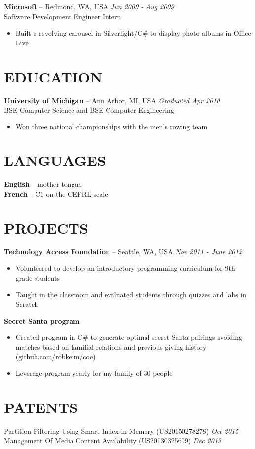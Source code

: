 \documentclass[]{rob-keim-resume}
\begin{document}
{\bf Microsoft} --  Redmond, WA, USA \hfill {\sl Jun 2009 - Aug 2009} \\
Software Development Engineer Intern
\begin{itemize} \itemsep -2pt
\item Built a revolving carousel in Silverlight/C\# to display photo albums in Office Live
\end{itemize}

\section{EDUCATION} 

{\bf University of Michigan} -- Ann Arbor, MI, USA \hfill {\sl Graduated Apr 2010} \\
BSE Computer Science and BSE Computer Engineering
\begin{itemize} \itemsep -2pt
\item Won three national championships with the men's rowing team
\end{itemize}

\section{LANGUAGES}

{\bf English} -- mother tongue \\
{\bf French} -- C1 on the CEFRL scale

\section{PROJECTS}

{\bf Technology Access Foundation} --  Seattle, WA, USA \hfill {\sl Nov 2011 - June 2012} 
\begin{itemize} \itemsep -2pt
	\item Volunteered to develop an introductory programming curriculum for 9th grade students
	\item Taught in the classroom and evaluated students through quizzes and labs in Scratch
\end{itemize}

{\bf Secret Santa program}
\begin{itemize} \itemsep -2pt
	\item Created program in C\# to generate optimal secret Santa pairings avoiding matches based on familial relations and previous giving history (github.com/robkeim/coe)
	\item Leverage program yearly for my family of 30 people
\end{itemize}

\section{PATENTS}

Partition Filtering Using Smart Index in Memory (US20150278278) \hfill {\sl Oct 2015} \\
Management Of Media Content Availability (US20130325609) \hfill {\sl Dec 2013}
\end{document}
